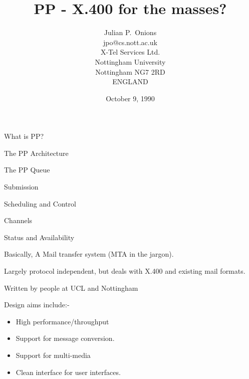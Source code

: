 

\raggedright


\title	{PP - X.400 for the masses?}

\author{Julian P.~Onions\\
jpo@cs.nott.ac.uk\\[.5in]
X-Tel Services Ltd.\\
Nottingham University\\
Nottingham NG7 2RD\\
ENGLAND}

\date	{October 9, 1990}

\maketitle

\begin{bwslide}
\begin{nrtc}
\item	What is PP?

\item	The PP Architecture

\item	The PP Queue

\item	Submission

\item	Scheduling and Control

\item	Channels

\item	Status and Availability
\end{nrtc}
\end{bwslide}

\begin{bwslide}
\begin{nrtc}
\item	Basically, A Mail transfer system (MTA in the jargon).

\item	Largely protocol independent, but deals with X.400
	and existing mail formats.

\item	Written by people at UCL and Nottingham

\item	Design aims include:-
	\begin{itemize}

	\item	High performance/throughput
	\item	Support for message conversion.
	\item	Support for multi-media
	\item	Clean interface for user interfaces.
	\end{itemize}

\end{nrtc}
\end{bwslide}

